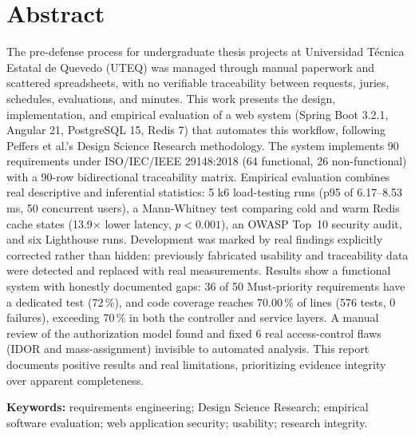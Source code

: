 \section*{Abstract}

The pre-defense process for undergraduate thesis projects at Universidad Técnica Estatal de Quevedo
(UTEQ) was managed through manual paperwork and scattered spreadsheets, with no verifiable traceability
between requests, juries, schedules, evaluations, and minutes. This work presents the design,
implementation, and empirical evaluation of a web system (Spring Boot 3.2.1, Angular 21, PostgreSQL 15,
Redis 7) that automates this workflow, following Peffers et al.'s Design Science Research methodology.
The system implements 90 requirements under ISO/IEC/IEEE 29148:2018 (64 functional, 26 non-functional)
with a 90-row bidirectional traceability matrix. Empirical evaluation combines real descriptive and
inferential statistics: 5 k6 load-testing runs (p95 of 6.17--8.53\,ms, 50 concurrent users), a
Mann-Whitney test comparing cold and warm Redis cache states (13.9$\times$ lower latency, $p<0.001$), an
OWASP Top~10 security audit, and six Lighthouse runs. Development was marked by real findings explicitly
corrected rather than hidden: previously fabricated usability and traceability data were detected and
replaced with real measurements. Results show a functional system with honestly documented gaps: 36 of
50 Must-priority requirements have a dedicated test (72\,\%), and code coverage reaches 70.00\,\% of
lines (576 tests, 0 failures), exceeding 70\,\% in both the controller and service layers. A manual review of the
authorization model found and fixed 6 real access-control flaws (IDOR and mass-assignment) invisible to
automated analysis. This report documents positive results and real limitations, prioritizing evidence
integrity over apparent completeness.

\textbf{Keywords:} requirements engineering; Design Science Research; empirical software evaluation; web
application security; usability; research integrity.
\newpage

